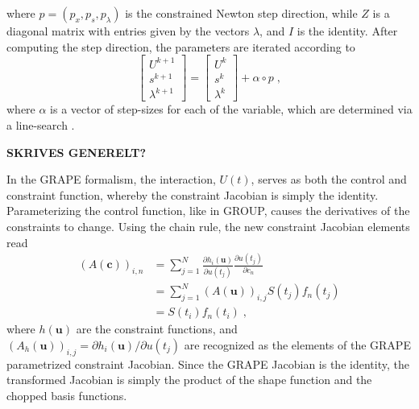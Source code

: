 where $p = ( p_x , p_s , p_{\lambda} )$ is the constrained Newton step direction, while $Z$ is a diagonal matrix with entries given by the vectors $\lambda$, and $I$ is the identity.
After computing the step direction, the parameters are iterated according to 
\begin{equation}
\begin{bmatrix}
  U^{k+1} \\ s^{k+1} \\ \lambda^{k+1} 
\end{bmatrix} 
=
\begin{bmatrix}
  U^{k} \\ s^{k} \\ \lambda^{k} 
\end{bmatrix} 
+ \alpha \circ p \; ,
\label{eq:ConNewtonStep}
\end{equation}
where $\alpha$ is a vector of step-sizes for each of the variable, which are determined via a line-search \cite{Wachter2005,Fletcher2002}.

\textbf{SKRIVES GENERELT?}

In the GRAPE formalism, the interaction, $U(t)$, serves as both the control and constraint function, whereby the constraint Jacobian is simply the identity. Parameterizing the control function, like in GROUP, causes the derivatives of the constraints to change. Using the chain rule, the new constraint Jacobian elements read
\begin{align}
	(A (\boldsymbol{c}))_{i,n}  &= \sum_{j = 1}^{N} \frac{\partial h_i (\boldsymbol{u} ) }{\partial u(t_j)} \frac{\partial u(t_j)}{\partial c_n} \nonumber \\
	&= \sum_{j = 1}^{N} (A (\boldsymbol{u}))_{i,j} S(t_j) f_n (t_j) \nonumber \\
	&=  S(t_i) f_n (t_i) \; ,
\end{align}
where $h(\boldsymbol{u})$ are the constraint functions, and $(A_h (\boldsymbol{u}))_{i,j} = {\partial h_i (\boldsymbol{u}) } / {\partial u(t_j)}$ are recognized as the elements of the GRAPE parametrized constraint Jacobian. Since the GRAPE Jacobian is the identity, the transformed Jacobian is simply the product of the shape function and the chopped basis functions. 